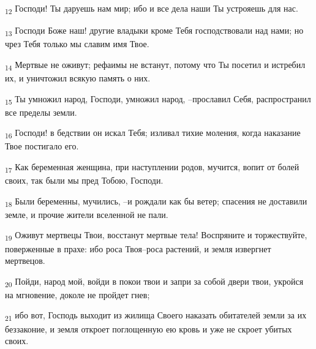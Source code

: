 \begin{tcolorbox}
\textsubscript{12} Господи! Ты даруешь нам мир; ибо и все дела наши Ты устрояешь для нас.
\end{tcolorbox}
\begin{tcolorbox}
\textsubscript{13} Господи Боже наш! другие владыки кроме Тебя господствовали над нами; но чрез Тебя только мы славим имя Твое.
\end{tcolorbox}
\begin{tcolorbox}
\textsubscript{14} Мертвые не оживут; рефаимы не встанут, потому что Ты посетил и истребил их, и уничтожил всякую память о них.
\end{tcolorbox}
\begin{tcolorbox}
\textsubscript{15} Ты умножил народ, Господи, умножил народ, --прославил Себя, распространил все пределы земли.
\end{tcolorbox}
\begin{tcolorbox}
\textsubscript{16} Господи! в бедствии он искал Тебя; изливал тихие моления, когда наказание Твое постигало его.
\end{tcolorbox}
\begin{tcolorbox}
\textsubscript{17} Как беременная женщина, при наступлении родов, мучится, вопит от болей своих, так были мы пред Тобою, Господи.
\end{tcolorbox}
\begin{tcolorbox}
\textsubscript{18} Были беременны, мучились, --и рождали как бы ветер; спасения не доставили земле, и прочие жители вселенной не пали.
\end{tcolorbox}
\begin{tcolorbox}
\textsubscript{19} Оживут мертвецы Твои, восстанут мертвые тела! Воспряните и торжествуйте, поверженные в прахе: ибо роса Твоя--роса растений, и земля извергнет мертвецов.
\end{tcolorbox}
\begin{tcolorbox}
\textsubscript{20} Пойди, народ мой, войди в покои твои и запри за собой двери твои, укройся на мгновение, доколе не пройдет гнев;
\end{tcolorbox}
\begin{tcolorbox}
\textsubscript{21} ибо вот, Господь выходит из жилища Своего наказать обитателей земли за их беззаконие, и земля откроет поглощенную ею кровь и уже не скроет убитых своих.
\end{tcolorbox}
